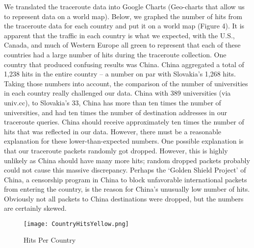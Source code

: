 \documentclass{sigcomm-alternate}
\begin{document}
We translated the traceroute data into Google Charts (Geo-charts that allow us to represent data on a world map). Below, we graphed the number of hits from the traceroute data for each country and put it on a world map (Figure 4). It is apparent that the traffic in each country is what we expected, with the U.S., Canada, and much of Western Europe all green to represent that each of these countries had a large number of hits during the traceroute collection. One country that produced confusing results was China. China aggregated a total of 1,238 hits in the entire country – a number on par with Slovakia’s 1,268 hits. Taking those numbers into account, the comparison of the number of universities in each country really challenged our data. China with 389 universities (via univ.cc), to Slovakia’s 33, China has more than ten times the number of universities, and had ten times the number of destination addresses in our traceroute queries. China should receive approximately ten times the number of hits that was reflected in our data. However, there must be a reasonable explanation for these lower-than-expected numbers. One possible explanation is that our traceroute packets randomly got dropped. However, this is highly unlikely as China should have many more hits; random dropped packets probably could not cause this massive discrepancy. Perhaps the ‘Golden Shield Project’ of China, a censorship program in China to block unfavorable international packets from entering the country, is the reason for China’s unusually low number of hits. Obviously not all packets to China destinations were dropped, but the numbers are certainly skewed. 

\begin{figure}[h!]
  \caption{Hits Per Country}
  \centering
    \texttt{[image: CountryHitsYellow.png]}
\end{figure}
\end{document}
